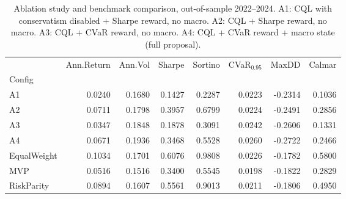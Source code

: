 \begin{table}
\caption{Ablation study and benchmark comparison, out-of-sample 2022--2024. A1: CQL with conservatism disabled + Sharpe reward, no macro. A2: CQL + Sharpe reward, no macro. A3: CQL + CVaR reward, no macro. A4: CQL + CVaR reward + macro state (full proposal).}
\label{tab:ablation_results}
\begin{tabular}{lrrrrrrr}
\toprule
 & Ann.Return & Ann.Vol & Sharpe & Sortino & CVaR$_{0.95}$ & MaxDD & Calmar \\
Config &  &  &  &  &  &  &  \\
\midrule
A1 & 0.0240 & 0.1680 & 0.1427 & 0.2287 & 0.0223 & -0.2314 & 0.1036 \\
A2 & 0.0711 & 0.1798 & 0.3957 & 0.6799 & 0.0224 & -0.2491 & 0.2856 \\
A3 & 0.0347 & 0.1848 & 0.1878 & 0.3091 & 0.0242 & -0.2606 & 0.1331 \\
A4 & 0.0671 & 0.1936 & 0.3468 & 0.5528 & 0.0260 & -0.2722 & 0.2466 \\
EqualWeight & 0.1034 & 0.1701 & 0.6076 & 0.9808 & 0.0226 & -0.1782 & 0.5800 \\
MVP & 0.0516 & 0.1516 & 0.3400 & 0.5545 & 0.0198 & -0.1822 & 0.2829 \\
RiskParity & 0.0894 & 0.1607 & 0.5561 & 0.9013 & 0.0211 & -0.1806 & 0.4950 \\
\bottomrule
\end{tabular}
\end{table}
